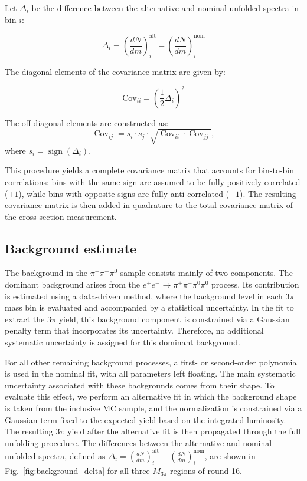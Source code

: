 Let $\Delta_i$ be the difference between the alternative and nominal unfolded spectra in bin $i$:

\begin{equation}
\Delta_i = \left( \frac{dN}{dm} \right)^{\text{alt}}_i - \left( \frac{dN}{dm} \right)^{\text{nom}}_i
\end{equation}

The diagonal elements of the covariance matrix are given by:

\begin{equation}
\text{Cov}_{ii} = \left( \frac{1}{2} \Delta_i \right)^2
\end{equation}

The off-diagonal elements are constructed as:
\[
\operatorname{Cov}_{ij} = s_i \cdot s_j \cdot \sqrt{\operatorname{Cov}_{ii} \cdot \operatorname{Cov}_{jj}},
\]
where $s_i = \operatorname{sign}(\Delta_i)$.

This procedure yields a complete covariance matrix that accounts for bin-to-bin correlations: bins with the same sign are assumed to be fully positively correlated ($+1$), while bins with opposite signs are fully anti-correlated ($-1$). The resulting covariance matrix is then added in quadrature to the total covariance matrix of the cross section measurement.

\subsection{Background estimate}

The background in the $\pi^+\pi^-\pi^0$ sample consists mainly of two components. The dominant background arises from the $e^+e^- \to \pi^+\pi^-\pi^0\pi^0$ process. Its contribution is estimated using a data-driven method, where the background level in each $3\pi$ mass bin is evaluated and accompanied by a statistical uncertainty. In the fit to extract the $3\pi$ yield, this background component is constrained via a Gaussian penalty term that incorporates its uncertainty. Therefore, no additional systematic uncertainty is assigned for this dominant background.

For all other remaining background processes, a first- or second-order polynomial is used in the nominal fit, with all parameters left floating. The main systematic uncertainty associated with these backgrounds comes from their shape. To evaluate this effect, we perform an alternative fit in which the background shape is taken from the inclusive MC sample, and the normalization is constrained via a Gaussian term fixed to the expected yield based on the integrated luminosity. The resulting $3\pi$ yield after the alternative fit is then propagated through the full unfolding procedure. The differences between the alternative and nominal unfolded spectra, defined as $\Delta_i = \left( \frac{dN}{dm} \right)^{\text{alt}}_i - \left( \frac{dN}{dm} \right)^{\text{nom}}_i$, are shown in Fig.~\ref{fig:background_delta} for all three $M_{3\pi}$ regions of round 16.

